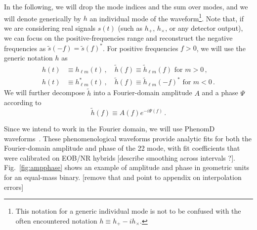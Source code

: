 \documentclass[aps,showpacs,twocolumn,
prd,superscriptaddress,nofootinbib]{revtex4-1}
\newcommand{\be}{\begin{equation}}
\newcommand{\ee}{\end{equation}}
\newcommand{\nn}{\nonumber}
\newcommand{\Hz}{\,\mathrm{Hz}}
\newcommand{\SM}[1]{{\color{Red} #1}}
\begin{document}
In the following, we will drop the mode indices and the sum over modes, and we will denote generically by $h$ an individual mode of the waveform\footnote{This notation for a generic individual mode is not to be confused with the often encountered notation $h\equiv h_{+} - i h_{\times}$.}. Note that, if we are considering real signals $s(t)$ (such as $h_{+}$, $h_{\times}$, or any detector output), we can focus  on the positive-frequencies range and reconstruct the negative frequencies as $\tilde{s}(-f) = \tilde{s}(f)^{*}$. For positive frequencies $f>0$, we will use the generic notation $h$ as
\begin{align}\label{eq:notationhsignm}
	h(t) &\equiv h_{\ell m}(t) \,, \quad \tilde{h}(f) \equiv \tilde{h}_{\ell m}(f) \text{ for } m>0 \,, \nn\\
	h(t) &\equiv h_{\ell m}^{*}(t) \,, \quad \tilde{h}(f) \equiv \tilde{h}_{\ell m}(-f)^{*} \text{ for } m<0 \,.
\end{align}
We will further decompose $\tilde{h}$ into a Fourier-domain amplitude $A$ and a phase $\Psi$ according to
\be\label{eq:defAPsi}
	\tilde{h}(f) \equiv A(f) e^{-i\Psi(f)} \,.
\ee

Since we intend to work in the Fourier domain, we will use PhenomD waveforms~\cite{Khan+15}. These phenomenological waveforms provide analytic fits for both the Fourier-domain amplitude and phase of the 22 mode, with fit coefficients that were calibrated on EOB/NR hybrids \SM{[describe smoothing across intervals ?]}. Fig.~\ref{fig:ampphase} shows an example of amplitude and phase in geometric units for an equal-mass binary. \SM{[remove that and point to appendix on interpolation errors]}

\end{document}
